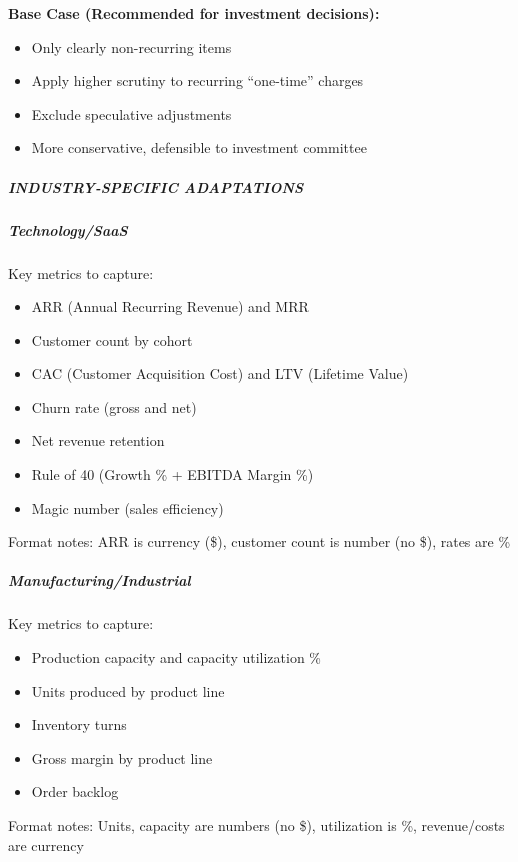 \documentclass[11pt]{article}
\begin{document}
\textbf{Base Case (Recommended for investment decisions):}

\begin{itemize}[leftmargin=*,itemsep=2pt,topsep=2pt]
\item {} Only clearly non-recurring items
\item {} Apply higher scrutiny to recurring ``one-time'' charges
\item {} Exclude speculative adjustments
\item {} More conservative, defensible to investment committee
\end{itemize}

\subparagraph{INDUSTRY-SPECIFIC ADAPTATIONS}\mbox{}\par

\subparagraph{Technology/SaaS}\mbox{}\par
Key metrics to capture:

\begin{itemize}[leftmargin=*,itemsep=2pt,topsep=2pt]
\item {} ARR (Annual Recurring Revenue) and MRR
\item {} Customer count by cohort
\item {} CAC (Customer Acquisition Cost) and LTV (Lifetime Value)
\item {} Churn rate (gross and net)
\item {} Net revenue retention
\item {} Rule of 40 (Growth \% + EBITDA Margin \%)
\item {} Magic number (sales efficiency)
\end{itemize}

Format notes: ARR is currency (\$), customer count is number (no \$), rates are \%


\subparagraph{Manufacturing/Industrial}\mbox{}\par
Key metrics to capture:

\begin{itemize}[leftmargin=*,itemsep=2pt,topsep=2pt]
\item {} Production capacity and capacity utilization \%
\item {} Units produced by product line
\item {} Inventory turns
\item {} Gross margin by product line
\item {} Order backlog
\end{itemize}

Format notes: Units, capacity are numbers (no \$), utilization is \%, revenue/costs are currency
\end{document}

